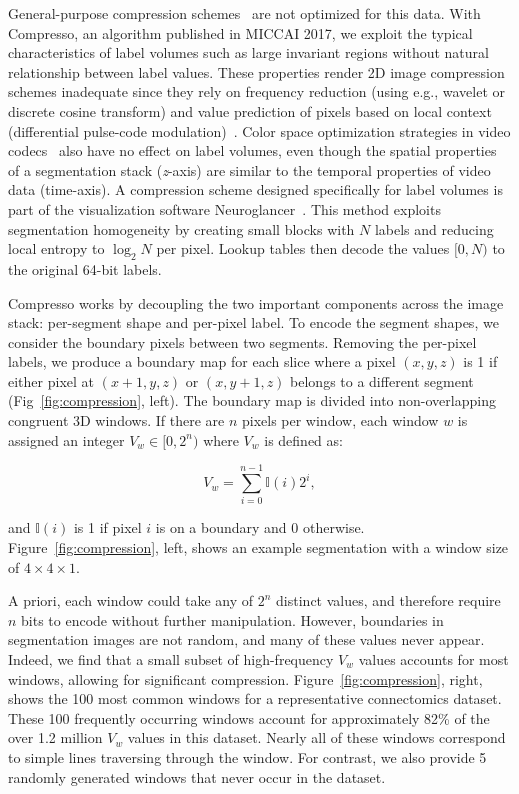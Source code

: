 General-purpose compression schemes~\cite{collet2016smaller,deutsch1996zlib,google2016brotli,lehmann2016liblzf,oberhumer2005lzo,pavlov2007lzma,seward1998bzip2,vandevenne2016zopfli,welch1984technique,ziv1978compression} are not optimized for this data.
With Compresso, an algorithm published in MICCAI 2017, we exploit the typical characteristics of label volumes such as large invariant regions without natural relationship between label values. 
These properties render 2D image compression schemes inadequate since they rely on frequency reduction (using e.g., wavelet or discrete cosine transform) and value prediction of pixels based on local context (differential pulse-code modulation)~\cite{roelofs1999png,skodras2001jpeg}. 
Color space optimization strategies in video codecs~\cite{aimar2005x264} also have no effect on label volumes, even though the spatial properties of a segmentation stack (\textit{z}-axis) are similar to the temporal properties of video data (time-axis). 
A compression scheme designed specifically for label volumes is part of the visualization software Neuroglancer~\cite{google2016compressed}. 
This method exploits segmentation homogeneity by creating small blocks with $N$ labels and reducing local entropy to $\log_2{N}$ per pixel. 
Lookup tables then decode the values $[0,N)$ to the original 64-bit labels.

Compresso works by decoupling the two important components across the image stack: per-segment shape and per-pixel label.
To encode the segment shapes, we consider the boundary pixels between two segments. 
Removing the per-pixel labels, we produce a boundary map for each slice where a pixel $(x, y, z)$ is 1 if either pixel at $(x + 1, y, z)$ or $(x, y + 1, z)$ belongs to a different segment (Fig~\ref{fig:compression}, left). 
The boundary map is divided into non-overlapping congruent 3D windows. If there are $n$ pixels per window, each window $w$ is assigned an integer $V_w \in [0, 2^n)$ where $V_w$ is defined as:

\begin{equation}
V_w = \sum_{i = 0}^{n - 1} \mathbb{I}(i) 2^i,
\end{equation}

\noindent
and $\mathbb{I}(i)$ is 1 if pixel $i$ is on a boundary and 0 otherwise. 
Figure~\ref{fig:compression}, left, shows an example segmentation with a window size of $4 \times 4 \times 1$.

A priori, each window could take any of $2^n$ distinct values, and therefore require $n$ bits to encode without further manipulation. 
However, boundaries in segmentation images are not random, and many of these values never appear. 
Indeed, we find that a small subset of high-frequency $V_w$ values accounts for most windows, allowing for significant compression. 
Figure~\ref{fig:compression}, right, shows the 100 most common windows for a representative connectomics dataset. 
These 100 frequently occurring windows account for approximately 82\% of the over 1.2 million $V_w$ values in this dataset.
Nearly all of these windows correspond to simple lines traversing through the window. 
For contrast, we also provide 5 randomly generated windows that never occur in the dataset.

